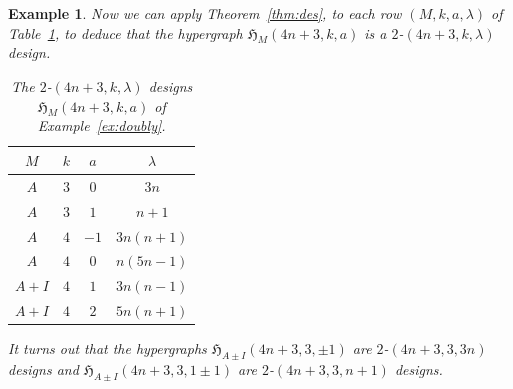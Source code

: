 \documentclass[11pt]{article}
\newtheorem{example}[theorem]{Example}
\begin{document}
\begin{example}


Now we can apply Theorem~\ref{thm:des}, to each row $(M,k,a,\lambda)$ of Table~\ref{tab:doubly}, to deduce that the hypergraph $\mathfrak H_{M}(4n+3,k,a)$ is a $2$-$(4n+3,k,\lambda)$ design.
\begin{table}[h!]
    \centering
    \begin{tabular}{c|c|c|c}
        $M$ &  $k$ & $a$ & $\lambda$ \\
        \hline
        $A$ & $3$ & $0$ & $3n$ \\
        $A$ & $3$ & $1$ & $n+1$ \\
        $A$ & $4$ & $-1$ & $3n(n+1)$ \\
        $A$ & $4$ & $0$ & $n(5n-1)$ \\
        $A+I$ & $4$ & $1$ & $3n(n-1)$ \\
        $A+I$ & $4$ & $2$ & $5n(n+1)$ \\
    \end{tabular}
    \caption{The $2$-$(4n+3,k,\lambda)$ designs $\mathfrak H_{M}(4n+3,k,a)$ of Example~\ref{ex:doubly}.}
    \label{tab:doubly}
\end{table}

It turns out that the hypergraphs $\mathfrak H_{A\pm I}(4n+3,3,\pm 1)$ are $2$-$(4n+3,3,3n)$ designs and $\mathfrak H_{A\pm I}(4n+3,3,1\pm 1)$ are $2$-$(4n+3,3,n+1)$ designs.
\end{example}
\end{document}
